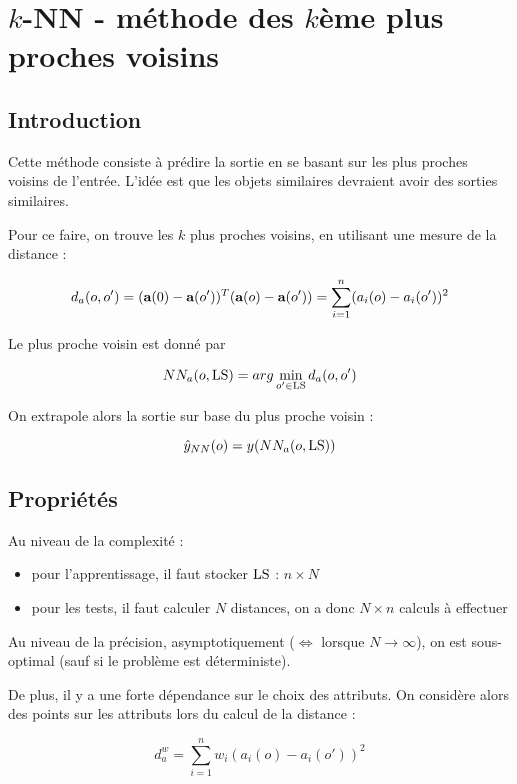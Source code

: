 \chapter{$k$-NN - méthode des $k$ème plus proches voisins}

	\section{Introduction}
		
	Cette méthode consiste à prédire la sortie en se basant sur les plus proches voisins de l'entrée. L'idée est que les objets similaires devraient avoir des sorties similaires.
		
		
	Pour ce faire, on trouve les $k$ plus proches voisins, en utilisant une mesure de la distance :
	
	$$d_a(o, o') = (\textbf{a}(0) - \textbf{a}(o'))^T(\textbf{a}(o) - \textbf{a}(o')) = \sum_{i = 1}^n(a_i(o) - a_i(o'))^2$$
	
	Le plus proche voisin est donné par
	
	$$NN_a(o, \text{LS}) = arg \min_{o' \in \text{LS}} d_a(o, o')$$
	
	On extrapole alors la sortie sur base du plus proche voisin :
	
	$$\hat{y}_{NN}(o) = y(NN_a(o, \text{LS}))$$
	
	\section{Propriétés}
	
	Au niveau de la complexité :
	
	\begin{itemize}
		\item pour l'apprentissage, il faut stocker $\text{LS}$ : $n \times N$
		\item pour les tests, il faut calculer $N$ distances, on a donc $N \times n$ calculs à effectuer
	\end{itemize}
	
	Au niveau de la précision, asymptotiquement ($\Leftrightarrow$ lorsque $N \rightarrow \infty$), on est sous-optimal (sauf si le problème est déterministe).
	
	De plus, il y a une forte dépendance sur le choix des attributs. On considère alors des points sur les attributs lors du calcul de la distance :
	
	$$d_a^w = \sum_{i = 1}^n w_i (a_i(o) - a_i(o'))^2$$
	
	
